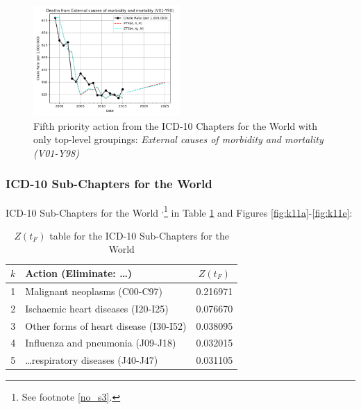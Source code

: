\documentclass[10pt, a4paper, twocolumn]{IEEEconf}
\begin{document}
\begin{figure}[H]
  \centering
  \includegraphics[width=0.5\textwidth]{results/WORLD_ICD10_CHAPTER_ROOTS/External_causes_of_morbidity_and_mortality_V01-Y98_ets.png}
  \caption{Fifth priority action from the ICD-10 Chapters for the World with only top-level groupings: \textit{External causes of morbidity and mortality (V01-Y98)}}\label{fig:k10e}
\end{figure}

\clearpage

\subsubsection{ICD-10 Sub-Chapters for the World}

ICD-10 Sub-Chapters for the World \citep{whomortality}\textsuperscript{,}\footnote{See footnote \ref{no_s3}.} in Table \ref{table:ztable11} and Figures \ref{fig:k11a}-\ref{fig:k11e}:

\begin{table}[H]
  \centering
  \begin{tabular}{clc}
    \toprule
      $k$ & Action (Eliminate: \ldots) & $Z(t_F)$ \\
    \midrule
      1 &                Malignant neoplasms (C00-C97) & 0.216971 \\
      2 &           Ischaemic heart diseases (I20-I25) & 0.076670 \\
      3 &       Other forms of heart disease (I30-I52) & 0.038095 \\
      4 &            Influenza and pneumonia (J09-J18) & 0.032015 \\
      5 &        \ldots respiratory diseases (J40-J47) & 0.031105 \\
    \bottomrule
  \end{tabular}
  \caption{$Z(t_F)$ table for the ICD-10 Sub-Chapters for the World}
  \label{table:ztable11}
\end{table}
\end{document}
